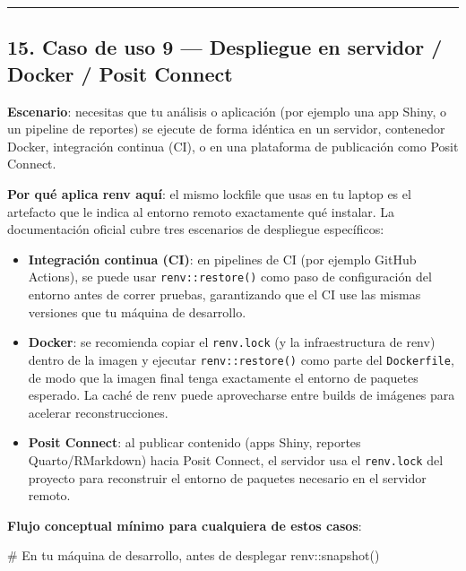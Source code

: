 \documentclass[
  man,
  floatsintext,
  longtable,
  a4paper,
  nolmodern,
  notxfonts,
  notimes,
  12pt,
  colorlinks=true,linkcolor=blue,citecolor=blue,urlcolor=blue]{apa7}
\newenvironment{Shaded}{\begin{snugshade}}{\end{snugshade}}
\newcommand{\CommentTok}[1]{\textcolor[rgb]{0.37,0.37,0.37}{#1}}
\newcommand{\FunctionTok}[1]{\textcolor[rgb]{0.28,0.35,0.67}{#1}}
\newcommand{\NormalTok}[1]{\textcolor[rgb]{0.00,0.23,0.31}{#1}}
\newcommand{\SpecialCharTok}[1]{\textcolor[rgb]{0.37,0.37,0.37}{#1}}
\providecommand{\tightlist}{%
  \setlength{\itemsep}{0pt}\setlength{\parskip}{0pt}}
\begin{document}
\begin{center}\rule{0.5\linewidth}{0.5pt}\end{center}

\subsection{15. Caso de uso 9 --- Despliegue en servidor / Docker /
Posit
Connect}\label{caso-de-uso-9-despliegue-en-servidor-docker-posit-connect}

\textbf{Escenario}: necesitas que tu análisis o aplicación (por ejemplo
una app Shiny, o un pipeline de reportes) se ejecute de forma idéntica
en un servidor, contenedor Docker, integración continua (CI), o en una
plataforma de publicación como Posit Connect.

\textbf{Por qué aplica renv aquí}: el mismo lockfile que usas en tu
laptop es el artefacto que le indica al entorno remoto exactamente qué
instalar. La documentación oficial cubre tres escenarios de despliegue
específicos:

\begin{itemize}
\tightlist
\item
  \textbf{Integración continua (CI)}: en pipelines de CI (por ejemplo
  GitHub Actions), se puede usar \texttt{renv::restore()} como paso de
  configuración del entorno antes de correr pruebas, garantizando que el
  CI use las mismas versiones que tu máquina de desarrollo.
\item
  \textbf{Docker}: se recomienda copiar el \texttt{renv.lock} (y la
  infraestructura de renv) dentro de la imagen y ejecutar
  \texttt{renv::restore()} como parte del \texttt{Dockerfile}, de modo
  que la imagen final tenga exactamente el entorno de paquetes esperado.
  La caché de renv puede aprovecharse entre builds de imágenes para
  acelerar reconstrucciones.
\item
  \textbf{Posit Connect}: al publicar contenido (apps Shiny, reportes
  Quarto/RMarkdown) hacia Posit Connect, el servidor usa el
  \texttt{renv.lock} del proyecto para reconstruir el entorno de
  paquetes necesario en el servidor remoto.
\end{itemize}

\textbf{Flujo conceptual mínimo para cualquiera de estos casos}:

\begin{Shaded}
\begin{Highlighting}[]
\CommentTok{\# En tu máquina de desarrollo, antes de desplegar}
\NormalTok{renv}\SpecialCharTok{::}\FunctionTok{snapshot}\NormalTok{()}
\end{Highlighting}
\end{Shaded}
\end{document}
